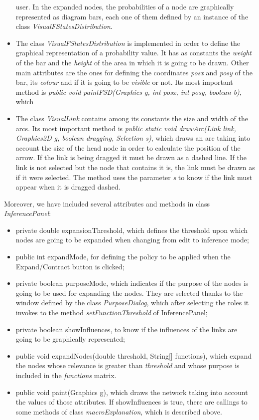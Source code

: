 \begin{itemize}
  user. In the expanded nodes, the probabilities of a node are graphically represented as diagram
  bars, each one of them defined by an instance of the class
  \emph{VisualFStatesDistribution}.
  \item The class \emph{VisualFStatesDistribution} is implemented
  in order to define the graphical representation of a probability
  value. It has as constants the \emph{weight} of the bar and the \emph{height} of the area in which it is going to be drawn.
  Other main attributes are the ones for defining the coordinates
  \emph{posx} and \emph{posy} of the bar, its \emph{colour} and if it is going
  to be \emph{visible} or not. Its most important method is \emph{public void paintFSD(Graphics g, int posx, int posy, boolean
  b)}, which
  \item The class \emph{VisualLink} contains among its constants the
  size and width of the arcs. Its most important method is \emph{public static void drawArc(Link link, Graphics2D g, boolean dragging,
  Selection  s)}, which draws an arc taking into account the size of the head node in order to calculate the position of the arrow.
  If the link is being dragged it must be drawn as a dashed line. If the link is not selected but the node that
contains it is, the link must be drawn as if it were selected. The
method uses the parameter \emph{s} to know if the link must appear
when it is dragged dashed.
\end{itemize}

Moreover, we have included several attributes and methods in class
\emph{InferencePanel}:
\begin{itemize}
  \item private double expansionThreshold, which defines the threshold
  upon which nodes are going to be expanded when changing from
  edit to inference mode;
  \item public int expandMode, for defining the policy to be applied when
  the Expand/Contract button is clicked;
  \item private boolean purposeMode, which indicates if the
  purpose of the nodes is going to be used for expanding the
  nodes. They are selected thanks to the window defined by the class \emph{PurposeDialog}, which after selecting the
  roles it invokes to the method \emph{setFunctionThreshold} of InferencePanel;
  \item private boolean showInfluences, to know if the
  influences of the links are going to be graphically represented;
  \item public void expandNodes(double threshold, String[]
  functions), which expand the nodes whose relevance is greater
  than \emph{threshold} and whose purpose is included in the \emph{functions}
  matrix.
  \item public void paint(Graphics g), which draws the network
  taking into account the values of those attributes. If
  showInfluences is true, there are callings to some methods
  of class \emph{macroExplanation}, which is described above.
\end{itemize}

